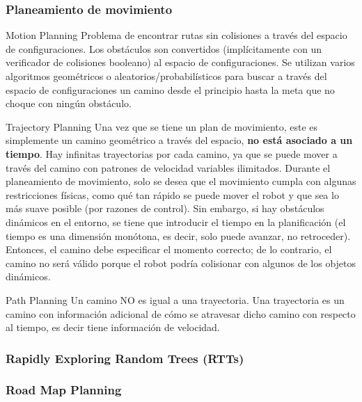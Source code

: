 \begin{frame}
	\frametitle{Planeamiento de movimiento}
	
	\begin{block}{Motion Planning}
		Problema de encontrar rutas sin colisiones a través del espacio de configuraciones. Los obstáculos son convertidos (implícitamente con un verificador de colisiones booleano) al espacio de configuraciones. Se utilizan varios algoritmos geométricos o aleatorios/probabilísticos para buscar a través del espacio de configuraciones un camino desde el principio hasta la meta que no choque con ningún obstáculo.
	\end{block}

	\begin{block}{Trajectory Planning}
		Una vez que se tiene un plan de movimiento, este es simplemente un camino geométrico a través del espacio, {\bf no está asociado a un tiempo}. Hay infinitas trayectorias por  cada camino, ya que se puede mover a través del camino con patrones de velocidad variables ilimitados. Durante el planeamiento de movimiento, solo se desea que el movimiento cumpla con algunas restricciones físicas, como qué tan rápido se puede mover el robot y que sea lo más suave posible (por razones de control). Sin embargo, si hay obstáculos dinámicos en el entorno, se tiene que introducir el tiempo en la planificación (el tiempo es una dimensión monótona, es decir, solo puede avanzar, no retroceder). Entonces, el camino debe especificar el momento correcto; de lo contrario, el camino no será válido porque el robot podría colisionar con algunos de los objetos dinámicos.
	\end{block}

	\begin{block}{Path Planning}
	Un camino NO es igual a una trayectoria. Una trayectoria es un camino con información adicional de cómo se atravesar dicho camino con respecto al tiempo, es decir tiene información de velocidad.
	\end{block}
\end{frame}


\begin{frame}
	\frametitle{Rapidly Exploring Random Trees (RTTs)}
	
\end{frame}

\begin{frame}
	\frametitle{Road Map Planning}
	
\end{frame}


